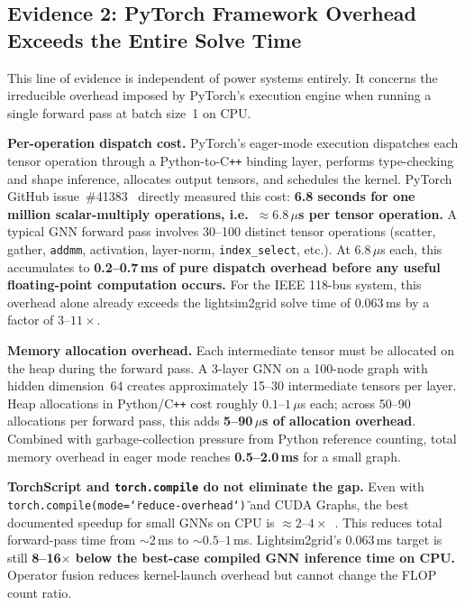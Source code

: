\documentclass[11pt]{article}
\begin{document}
\subsection{Evidence 2: PyTorch Framework Overhead Exceeds the Entire Solve Time}

This line of evidence is independent of power systems entirely.  It
concerns the irreducible overhead imposed by PyTorch's execution engine
when running a single forward pass at batch size~1 on CPU.

\textbf{Per-operation dispatch cost.}
PyTorch's eager-mode execution dispatches each tensor operation through a
Python-to-C\texttt{++} binding layer, performs type-checking and shape
inference, allocates output tensors, and schedules the kernel.
PyTorch GitHub issue~\#41383~\cite{pytorch_overhead} directly measured
this cost: \textbf{6.8 seconds for one million scalar-multiply operations,
i.e.\ ${\approx}6.8\,\mu$s per tensor operation.}
A typical GNN forward pass involves 30--100 distinct tensor operations
(scatter, gather, \texttt{addmm}, activation, layer-norm,
\texttt{index\_select}, etc.).  At $6.8\,\mu$s each, this accumulates
to \textbf{0.2--0.7\,ms of pure dispatch overhead before any useful
floating-point computation occurs.}  For the IEEE 118-bus system, this
overhead alone already exceeds the lightsim2grid solve time of
$0.063$\,ms by a factor of $3$--$11\times$.

\textbf{Memory allocation overhead.}
Each intermediate tensor must be allocated on the heap during the forward
pass.  A 3-layer GNN on a 100-node graph with hidden dimension~64 creates
approximately 15--30 intermediate tensors per layer.  Heap allocations
in Python/C\texttt{++} cost roughly $0.1$--$1\,\mu$s each; across 50--90
allocations per forward pass, this adds \textbf{5--90\,$\mu$s of
allocation overhead}.  Combined with garbage-collection pressure from
Python reference counting, total memory overhead in eager mode reaches
\textbf{0.5--2.0\,ms} for a small graph.

\textbf{TorchScript and \texttt{torch.compile} do not eliminate the gap.}
Even with \texttt{torch.compile(mode=\char`\"reduce-overhead\char`\")} and CUDA
Graphs, the best documented speedup for small GNNs on CPU is
${\approx}2$--$4\times$~\cite{pyg_compile}.  This reduces total
forward-pass time from ${\sim}2$\,ms to ${\sim}0.5$--$1$\,ms.
Lightsim2grid's $0.063$\,ms target is still \textbf{8--16$\times$ below
the best-case compiled GNN inference time on CPU.}  Operator fusion
reduces kernel-launch overhead but cannot change the FLOP count ratio.
\end{document}

